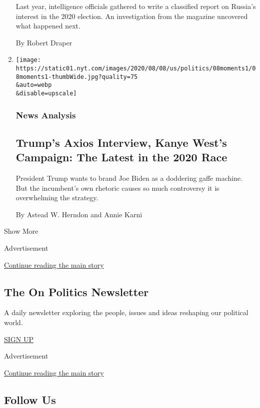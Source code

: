 \begin{enumerate}
  Last year, intelligence officials gathered to write a classified
  report on Russia's interest in the 2020 election. An investigation
  from the magazine uncovered what happened next.

  By Robert Draper
\item
  \href{/2020/08/08/us/politics/trump-biden-polls-interview.html}{}

  \texttt{[image: https://static01.nyt.com/images/2020/08/08/us/politics/08moments1/08moments1-thumbWide.jpg?quality=75\\\&auto=webp\\\&disable=upscale]}

  \hypertarget{news-analysis-1}{%
  \subsubsection{News Analysis}\label{news-analysis-1}}

  \hypertarget{trumps-axios-interview-kanye-wests-campaign-the-latest-in-the-2020-race}{%
  \subsection{Trump's Axios Interview, Kanye West's Campaign: The Latest
  in the 2020
  Race}\label{trumps-axios-interview-kanye-wests-campaign-the-latest-in-the-2020-race}}

  President Trump wants to brand Joe Biden as a doddering gaffe machine.
  But the incumbent's own rhetoric causes so much controversy it is
  overwhelming the strategy.

  By Astead W. Herndon and Annie Karni
\end{enumerate}

Show More

Advertisement

\protect\hyperlink{after-mid2}{Continue reading the main story}

\hypertarget{the-on-politics-newsletter}{%
\subsection{The On Politics
Newsletter}\label{the-on-politics-newsletter}}

A daily newsletter exploring the people, issues and ideas reshaping our
political world.

\href{/newsletters/signup/CN}{SIGN UP}

Advertisement

\protect\hyperlink{after-mktg}{Continue reading the main story}

\hypertarget{follow-us}{%
\subsection{Follow Us}\label{follow-us}}

